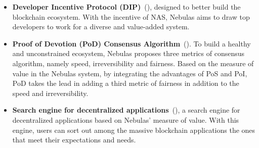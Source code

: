 {\begin{itemize}
	\item \textbf{Developer Incentive Protocol (DIP)}~(), designed to better build the blockchain ecosystem. With the incentive of NAS, Nebulas aims to draw top developers to work for a diverse and value-added system.

  \item \textbf{Proof of Devotion (PoD) Consensus Algorithm}~(). To build a healthy and unconstrained ecosystem, Nebulas proposes three metrics of consensus algorithm, namely speed, irreversibility and fairness. Based on the measure of value in the Nebulas system, by integrating the advantages of PoS and PoI, PoD takes the lead in adding a third metric of fairness in addition to the speed and irreversibility.

  \item \textbf{Search engine for decentralized applications}~(), a search engine for decentralized applications based on Nebulas’ measure of value. With this engine, users can sort out among the massive blockchain applications the ones that meet their expectations and needs.

\end{itemize}
}
